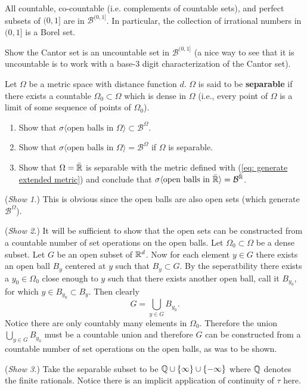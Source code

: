 \begin{example}
All countable, co-countable (i.e. complements of countable sets), and perfect subsets of $(0,1]$ are in $\mathcal B^{(0,1]}$. In particular, the collection of  irrational numbers in $(0,1]$ is a Borel set.
\end{example}

\begin{example}
Show the Cantor set is an uncountable set in $\mathcal B^{(0,1]}$ (a nice way to see that it is uncountable is to work with a base-3 digit characterization of the Cantor set).
\end{example}


\begin{exercise}
Let $\Omega$ be a metric space with distance function $d$. $\Omega$ is said to be {\bf separable} if there exists a countable $\Omega_0\subset \Omega$ which is dense in $\Omega$ (i.e., every point of $\Omega$ is a limit of some sequence of points of $\Omega_0$).
\begin{enumerate}
\item Show that $\sigma\langle \text{open balls in $\Omega$}\rangle\subset \mathcal B^{\Omega}$.
\item Show that  $\sigma\langle \text{open balls in $\Omega$}\rangle= \mathcal B^{\Omega}$ if $\Omega$ is separable.
\item Show that $\Omega = \bar {\Bbb R}$ is separable with the metric defined with (\ref{eq: generate extended metric}) and conclude that $\sigma\langle \text{open balls in $\bar{\Bbb R}$}\rangle= \mathcal B^{\bar{\Bbb R}}$.
\end{enumerate}
\end{exercise}

\begin{exerciseproof}
({\sl Show 1.})
This is obvious since the open balls are also open sets (which generate $\mathcal B^{\Omega}$).

({\sl Show 2.})
It will be sufficient to show that the open sets can be constructed from a countable number of set operations on the open balls. Let $\Omega_0\subset \Omega$ be a dense subset.
Let $G$ be an open subset of $\Bbb R^d$. Now for each element $y\in G$ there exists an open ball $B_y$ centered at $y$ such that $B_y\subset G$. By the seperatbility there exists a $y_0\in \Omega_0$ close enough to $y$ such that there exists another open ball, call it $B_{y_0}$, for which  $y\in B_{y_0}\subset B_y$. Then clearly
\[
G = \bigcup_{y\in G} B_{y_0}.
\]
 Notice  there are only countably many elements in $\Omega_0$. Therefore the union $ \bigcup_{y\in G} B_{y_0}$ must be a countable union  and therefore $G$ can be constructed  from a countable number of set operations on the open balls, as was to be shown.


({\sl Show 3.}) Take the separable subset to be $\Bbb Q\cup \{ \infty\} \cup \{ -\infty\}$ where $\Bbb Q$ denotes the finite rationals. Notice there is an implicit application of continuity of $\tau$ here.
\end{exerciseproof}

